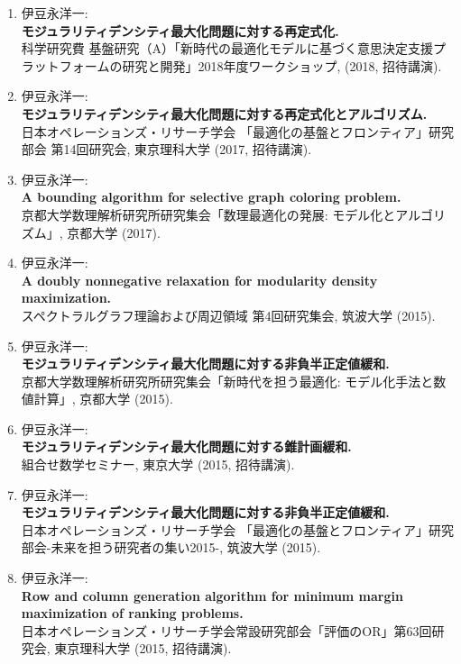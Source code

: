 \documentclass[dvipdfmx,9pt,a4paper]{article}
\begin{document}
\begin{enumerate}

\item 伊豆永洋一:\\
{\bf モジュラリティデンシティ最大化問題に対する再定式化.}\\
{科学研究費 基盤研究（A）「新時代の最適化モデルに基づく意思決定支援プラットフォームの研究と開発」2018年度ワークショップ}, (2018, 招待講演).

\item 伊豆永洋一:\\
{\bf モジュラリティデンシティ最大化問題に対する再定式化とアルゴリズム.}\\
{日本オペレーションズ・リサーチ学会 「最適化の基盤とフロンティア」研究部会 第14回研究会}, 東京理科大学 (2017, 招待講演).

\item 伊豆永洋一:\\
{\bf A bounding algorithm for selective graph coloring problem.}\\
{京都大学数理解析研究所研究集会「数理最適化の発展: モデル化とアルゴリズム」}, 京都大学 (2017).

\item 伊豆永洋一:\\
{\bf A doubly nonnegative relaxation for modularity density maximization.}\\
{スペクトラルグラフ理論および周辺領域 第4回研究集会}, 筑波大学 (2015).

\item 伊豆永洋一:\\
{\bf モジュラリティデンシティ最大化問題に対する非負半正定値緩和.}\\
{京都大学数理解析研究所研究集会「新時代を担う最適化: モデル化手法と数値計算」}, 京都大学 (2015).

\item 伊豆永洋一:\\
{\bf モジュラリティデンシティ最大化問題に対する錐計画緩和.}\\
{組合せ数学セミナー}, 東京大学 (2015, 招待講演).

\item 伊豆永洋一:\\
{\bf モジュラリティデンシティ最大化問題に対する非負半正定値緩和.}\\
{日本オペレーションズ・リサーチ学会 「最適化の基盤とフロンティア」研究部会-未来を担う研究者の集い2015-}, 筑波大学 (2015).

\item 伊豆永洋一:\\
{\bf Row and column generation algorithm for minimum margin maximization of ranking problems.}\\
{日本オペレーションズ・リサーチ学会常設研究部会「評価のOR」第63回研究会}, 東京理科大学 (2015, 招待講演).


\end{enumerate}
\end{document}
